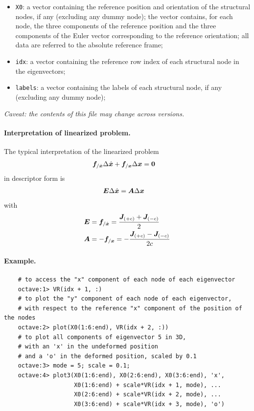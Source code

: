 \begin{itemize}
\item \texttt{X0}: a vector containing the reference position
and orientation of the structural nodes, if any (excluding any dummy node);
the vector contains, for each node, the three components
of the reference position and the three components of the Euler vector
corresponding to the reference orientation; all data are referred
to the absolute reference frame;

\item \texttt{idx}: a vector containing the reference row index
  of each structural node in the eigenvectors;

\item \texttt{labels}: a vector containing the labels of each structural node, if any (excluding any dummy node);
\end{itemize}

\emph{Caveat: the contents of this file may change across versions.}

\paragraph{Interpretation of linearized problem.}
The typical interpretation of the linearized problem
\begin{align}
	\boldsymbol{f}_{/\dot{\boldsymbol{x}}} \Delta\dot{\boldsymbol{x}} + \boldsymbol{f}_{/\boldsymbol{x}} \Delta\boldsymbol{x} &= \boldsymbol{0}
\end{align}
in descriptor form is
\begin{align}
	\boldsymbol{E} \Delta\dot{\boldsymbol{x}} &= \boldsymbol{A} \Delta\boldsymbol{x}
\end{align}
with
\begin{subequations}
\begin{align}
	\boldsymbol{E} &= \boldsymbol{f}_{/\dot{\boldsymbol{x}}} = \frac{\boldsymbol{J}_{(+c)} + \boldsymbol{J}_{(-c)}}{2}
	\\
	\boldsymbol{A} &= - \boldsymbol{f}_{/\boldsymbol{x}} = - \frac{\boldsymbol{J}_{(+c)} - \boldsymbol{J}_{(-c)}}{2 c}
\end{align}
\end{subequations}


\paragraph{Example.}
\begin{verbatim}
    # to access the "x" component of each node of each eigenvector
    octave:1> VR(idx + 1, :)
    # to plot the "y" component of each node of each eigenvector,
    # with respect to the reference "x" component of the position of the nodes
    octave:2> plot(X0(1:6:end), VR(idx + 2, :))
    # to plot all components of eigenvector 5 in 3D,
    # with an 'x' in the undeformed position
    # and a 'o' in the deformed position, scaled by 0.1
    octave:3> mode = 5; scale = 0.1;
    octave:4> plot3(X0(1:6:end), X0(2:6:end), X0(3:6:end), 'x',
                    X0(1:6:end) + scale*VR(idx + 1, mode), ...
                    X0(2:6:end) + scale*VR(idx + 2, mode), ...
                    X0(3:6:end) + scale*VR(idx + 3, mode), 'o')
\end{verbatim}



